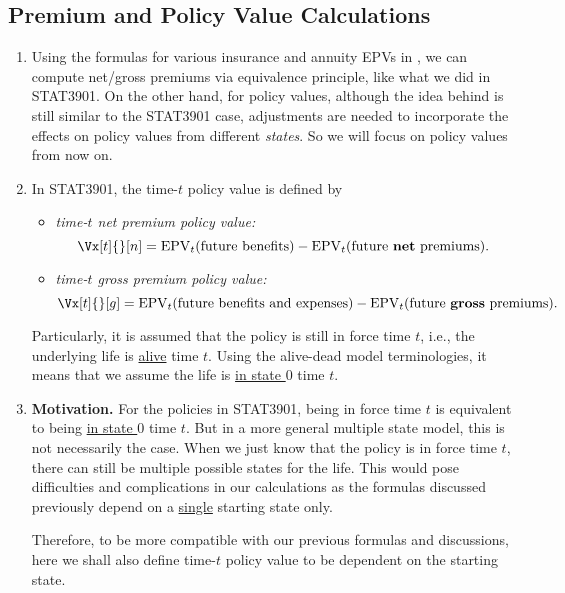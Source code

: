 \subsection{Premium and Policy Value Calculations}
\label{subsect:mult-state-prem-pv}
\begin{enumerate}
\item Using the formulas for various insurance and annuity EPVs in
, we can compute net/gross premiums via
equivalence principle, like what we did in STAT3901. On the other hand, for
policy values, although the idea behind is still similar to the STAT3901 case,
adjustments are needed to incorporate the effects on policy values from
different \emph{states}. So we will focus on policy values from now on.

\item In STAT3901, the time-\(t\) policy value is defined by
\begin{itemize}
\item \emph{time-\(t\) net premium policy value:}
\[\Vx[t]{}[n]
=\epvt{t}{\text{future benefits}}-\epvt{t}{\text{future \textbf{net} premiums}}.\]
\item \emph{time-\(t\) gross premium policy value:}
\[\Vx[t]{}[g]
=\epvt{t}{\text{future benefits and expenses}}-\epvt{t}{\text{future \textbf{gross} premiums}}.\]
\end{itemize}
Particularly, it is assumed that the policy is still in force  time
\(t\), i.e., the underlying life is \underline{alive}  time \(t\).
Using the alive-dead model terminologies, it means that we assume the life is
\underline{in state \(0\)}  time \(t\).

\item \textbf{Motivation.} For the policies in STAT3901, being in force
 time \(t\) is equivalent to being \underline{in state \(0\)}
 time \(t\). But in a more general multiple state model, this is not
necessarily the case. When we just know that the policy is in force 
time \(t\), there can still be multiple possible states for the life. This
would pose difficulties and complications in our calculations as the formulas
discussed previously depend on a \underline{single} starting state only.

Therefore, to be more compatible with our previous formulas and discussions,
here we shall also define time-\(t\) policy value to be dependent on the
starting state.


\end{enumerate}
